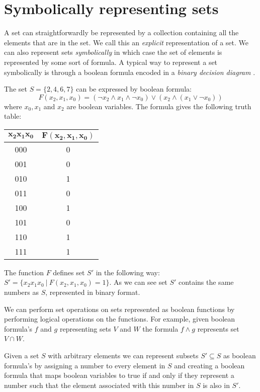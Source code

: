 \section{Symbolically representing sets}
A set can straightforwardly be represented by a collection containing all the elements that are in the set. We call this an \textit{explicit} representation of a set. We can also represent sets \textit{symbolically} in which case the set of elements is represented by some sort of formula. A typical way to represent a set symbolically is through a boolean formula encoded in a \textit{binary decision diagram} \cite{BDD_book,Handbook_BDD_Chapter}. 

\begin{example}
	\label{ex_boolform}
	The set $S = \{ 2,4,6,7 \}$ can be expressed by boolean formula:
	\[ F(x_2,x_1,x_0) = (\neg x_2 \wedge x_1 \wedge \neg x_0) \vee (x_2 \wedge (x_1 \vee \neg x_0)) \]
	where $x_0,x_1$ and $x_2$ are boolean variables. The formula gives the following truth table:\\
	\begin{center}
		\begin{tabular}{|c|c|}
			\hline 
			$\mathbf{x_2x_1x_0}$ & $\mathbf{F(x_2,x_1,x_0)}$ \\ 
			\hline 
			000 & 0 \\ 
			\hline 
			001 & 0 \\ 
			\hline 
			010 & 1 \\ 
			\hline 
			011 & 0 \\ 
			\hline 
			100 & 1 \\ 
			\hline 
			101 & 0 \\ 
			\hline 
			110 & 1 \\ 
			\hline 
			111 & 1 \\ 
			\hline
		\end{tabular} 
	\end{center}
	The function $F$ defines set $S'$ in the following way: $S' = \{x_2x_1x_0\ |\ F(x_2,x_1,x_0) = 1 \}$. As we can see set $S'$ contains the same numbers as $S$, represented in binary format.
\end{example}
We can perform set operations on sets represented as boolean functions by performing logical operations on the functions. For example, given boolean formula's $f$ and $g$ representing sets $V$ and $W$ the formula $f \wedge g$ represents set $V \cap W$.

Given a set $S$ with arbitrary elements we can represent subsets $S' \subseteq S$ as boolean formula's by assigning a number to every element in $S$ and creating a boolean formula that maps boolean variables to true if and only if they represent a number such that the element associated with this number in $S$ is also in $S'$.

